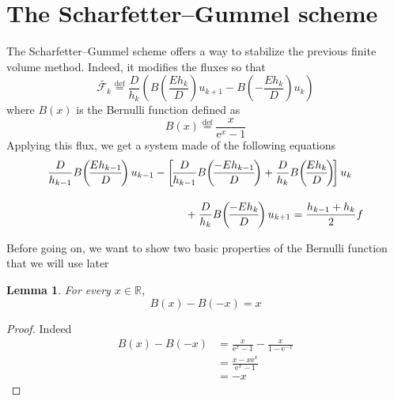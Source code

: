 \documentclass[a4paper,11pt, draft]{article}
\newtheorem{lemma}{Lemma}[prop]
\newcommand{\Def}{\stackrel{\mathrm{def}}{=}}
\begin{document}
\section{The Scharfetter--Gummel scheme}
The Scharfetter--Gummel scheme offers a way to stabilize the previous finite volume method. Indeed, 
it modifies the fluxes so that
\[ \widetilde{\mathcal{F}_{k}} \Def \frac{D}{h_k} \left(\! B\left(\frac{E h_k}{D}\right) u_{k+1} - 
B\left(-\frac{E h_k}{D}\right) u_k \right)  \]
where $B(x)$ is the Bernulli function defined as
\[ B(x) \Def \frac{x}{\mathrm{e}^x - 1} \]
Applying this flux, we get a system made of the following equations
%
\begin{equation}\label{eq:sg_system}
\begin{multlined}[.98\displaywidth]
 \frac{D}{h_{k - 1}} B\!\left(\! \frac{E h_{k-1}}{D} \!\right) u_{k-1} - \left[ \! \frac{D}{h_{k - 
1}} B\!\left(\! \frac{- E h_{k-1}}{D} \!\right) + \frac{D}{h_k} 
B\!\left(\! \frac{E h_k}{D} \!\right) \! \right] u_k \\[10pt] + \frac{D}{h_k} B\!\left(\! \frac{- E 
h_k}{D} \!\right) u_{k + 1} = \frac{h_{k - 1} + h_{k}}{2} f
\end{multlined}
\end{equation}


Before going on, we want to show two basic properties of the Bernulli function that we will use 
later

\begin{lemma} \label{bernulli_inverse}
 For every $x \in \mathbb{R}$,
 \[ B(x) - B(-x) = x \]
\end{lemma}
\begin{proof}
 Indeed
 \[
  \begin{split}
   B(x) - B(-x) & = \frac{x}{\mathrm{e}^x - 1} - \frac{x}{1 - \mathrm{e}^{-x}} \\
                & = \frac{x - x \mathrm{e}^{x}}{\mathrm{e}^x - 1} \\
                & = -x
  \end{split}
 \]
\end{proof}
\end{document}

